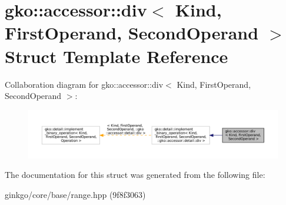 \hypertarget{structgko_1_1accessor_1_1div}{}\section{gko\+:\+:accessor\+:\+:div$<$ Kind, First\+Operand, Second\+Operand $>$ Struct Template Reference}
\label{structgko_1_1accessor_1_1div}


Collaboration diagram for gko\+:\+:accessor\+:\+:div$<$ Kind, First\+Operand, Second\+Operand $>$\+:
\nopagebreak
\begin{figure}[H]
\begin{center}
\leavevmode
\includegraphics[width=350pt]{structgko_1_1accessor_1_1div__coll__graph}
\end{center}
\end{figure}


The documentation for this struct was generated from the following file\+:\begin{DoxyCompactItemize}
\item 
ginkgo/core/base/range.\+hpp (9f8f3063)\end{DoxyCompactItemize}
